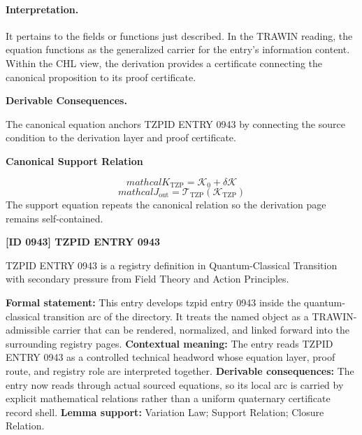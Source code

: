 \paragraph{Interpretation.}
It pertains to the fields or functions just described. In the TRAWIN reading, the equation functions as the generalized carrier for the entry’s information content. Within the CHL view, the derivation provides a certificate connecting the canonical proposition to its proof certificate.

\par\vspace{0.35em}
\noindent\textbf{Derivable Consequences.}\quad
\begingroup
\footnotesize
\raggedright
The canonical equation anchors TZPID ENTRY 0943 by connecting the source condition to the derivation layer and proof certificate.
\par\endgroup

\noindent\textbf{Canonical Support Relation}\par
\[
mathcal{K}_{\mathrm{TZP}} = \mathcal{K}_0 + \delta \mathcal{K}
\]
\[
mathcal{J}_{\mathrm{out}} = \mathcal{T}_{\mathrm{TZP}}\!\left(\mathcal{K}_{\mathrm{TZP}}\right)
\]
\noindent The support equation repeats the canonical relation so the derivation page remains self-contained.\par

\clearpage
\noindent\textbf{[ID 0943] TZPID ENTRY 0943}\par
\vspace{0.35em}
\begingroup\small
{}
TZPID ENTRY 0943 is a registry definition in Quantum-Classical Transition with secondary pressure from Field Theory and Action Principles.

\begingroup\footnotesize\setlength{\emergencystretch}{3em}\sloppy
\textbf{Formal statement:} This entry develops tzpid entry 0943 inside the quantum-classical transition arc of the directory. It treats the named object as a TRAWIN-admissible carrier that can be rendered, normalized, and linked forward into the surrounding registry pages. \textbf{Contextual meaning:} The entry reads TZPID ENTRY 0943 as a controlled technical headword whose equation layer, proof route, and registry role are interpreted together. \textbf{Derivable consequences:} The entry now reads through actual sourced equations, so its local arc is carried by explicit mathematical relations rather than a uniform quaternary certificate record shell. \textbf{Lemma support:} Variation Law; Support Relation; Closure Relation.\par
\endgroup

